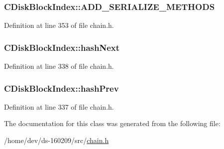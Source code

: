 \subsubsection[{A\+D\+D\+\_\+\+S\+E\+R\+I\+A\+L\+I\+Z\+E\+\_\+\+M\+E\+T\+H\+O\+D\+S}]{\setlength{\rightskip}{0pt plus 5cm}C\+Disk\+Block\+Index\+::\+A\+D\+D\+\_\+\+S\+E\+R\+I\+A\+L\+I\+Z\+E\+\_\+\+M\+E\+T\+H\+O\+D\+S}\label{class_c_disk_block_index_adfa97e82f2e6db827fc6b8b5e351a1f9}


Definition at line 353 of file chain.\+h.

\hypertarget{class_c_disk_block_index_a0dda572f44335a5317de18001c3594a8}{}
\subsubsection[{hash\+Next}]{ C\+Disk\+Block\+Index\+::hash\+Next}\label{class_c_disk_block_index_a0dda572f44335a5317de18001c3594a8}


Definition at line 338 of file chain.\+h.

\hypertarget{class_c_disk_block_index_a3a1730201a8523fb947c4d4f632a4212}{}
\subsubsection[{hash\+Prev}]{ C\+Disk\+Block\+Index\+::hash\+Prev}\label{class_c_disk_block_index_a3a1730201a8523fb947c4d4f632a4212}


Definition at line 337 of file chain.\+h.



The documentation for this class was generated from the following file\+:\begin{DoxyCompactItemize}
\item 
/home/dev/ds-\/160209/src/\hyperlink{chain_8h}{chain.\+h}\end{DoxyCompactItemize}
